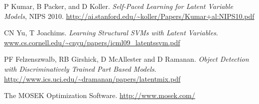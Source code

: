 \documentclass{article}
\begin{document}
\begin{thebibliography}{9}


 P Kumar, B Packer, and D Koller. \emph{Self-Paced Learning for Latent Variable Models},
NIPS 2010. \url{http://ai.stanford.edu/~koller/Papers/Kumar+al:NIPS10.pdf}

 CN Yu, T Joachims. \emph{Learning Structural SVMs with Latent Variables}. \url{www.cs.cornell.edu/~cnyu/papers/icml09_latentssvm.pdf}

 PF Felzenszwalb, RB Girshick, D McAllester and D Ramanan. \emph{Object Detection with Discriminatively Trained
Part Based Models}.  \url{http://www.ics.uci.edu/~dramanan/papers/latentmix.pdf}

 The MOSEK Optimization Software. \url{http://www.mosek.com/}

\end{thebibliography}
\end{document}
